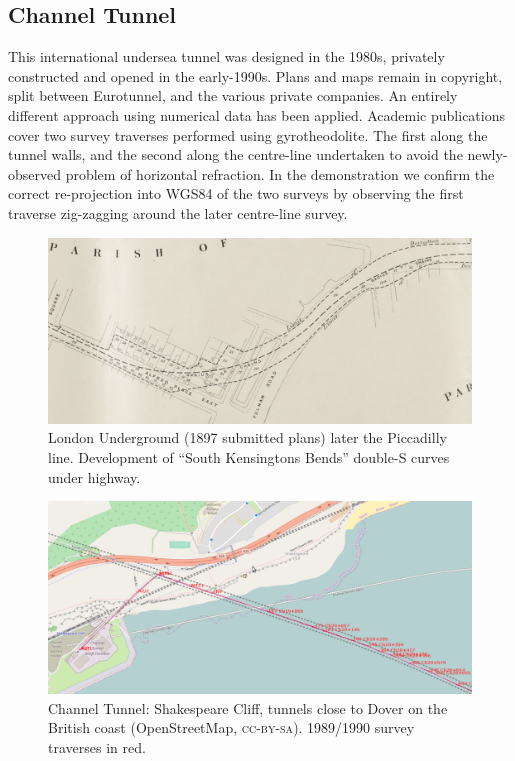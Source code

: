 \documentclass[conference,a4paper]{IEEEtran}
\begin{document}
\vspace{-3em}
\subsection{Channel Tunnel}

This international undersea tunnel was designed in the 1980s,
privately constructed and opened in the early-1990s.  Plans and maps
remain in copyright, split between Eurotunnel, and the various private
companies.  An entirely different approach using numerical data has
been applied.\cite{osm-wiki-chunnel}\nocite{sladen-sotm2013} Academic publications cover two
survey traverses performed using gyrotheodolite.\cite{korittke-1997}
The first along the tunnel walls, and the second along the centre-line
undertaken to avoid the newly-observed problem of horizontal
refraction.\cite{korittke-1989} In the demonstration we confirm the
correct re-projection into WGS84 of the two surveys by observing the
first traverse zig-zagging around the later centre-line survey.

\begin{figure}[!lt]
  \centering
  \includegraphics[width=15.1cm]{reverse-curves-cropped}
  \vspace{-0.5em}
  \caption{London Underground (1897 submitted plans) later the Piccadilly line.  Development of ``South Kensingtons Bends'' double-S curves under highway.}
  \label{south-ken-bends}
\end{figure}
\vspace{-1em}
\begin{figure}[!lt]
  \centering
  \includegraphics[width=15.1cm]{shakespeare-cliff-cropped}
  \vspace{-0.5em}
  \caption{Channel Tunnel: Shakespeare Cliff, tunnels close to Dover on the British coast (OpenStreetMap, \textsc{cc-by-sa}). 1989/1990 survey traverses in red.}
  \label{osm-channel-tunnel-traverse}
\end{figure}




\end{document}

